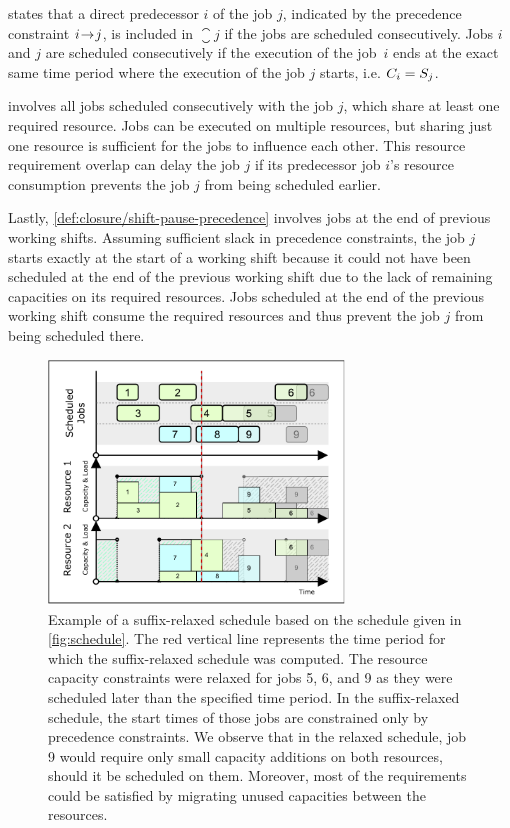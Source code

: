  states that a direct predecessor $i$ of the job $j$,
indicated by the precedence constraint $i \hspace{-0.2em} \rightarrow \hspace{-0.2em} j$,
is included in $\closure{j}$ if the jobs are scheduled consecutively.
Jobs $i$ and $j$ are scheduled consecutively if the execution of the job~$i$ ends
at the exact same time period where the execution of the job $j$ starts,
i.e. $C_{i} = S_{j}$.

 involves all jobs scheduled consecutively with the job $j$,
which share at least one required resource.
Jobs can be executed on multiple resources,
but sharing just one resource is sufficient for the jobs to influence each other.
This resource requirement overlap can delay the job $j$ if its predecessor job $i$'s resource consumption
prevents the job $j$ from being scheduled earlier.

Lastly, \cref{def:closure/shift-pause-precedence} involves jobs at the end of previous working shifts.
Assuming sufficient slack in precedence constraints,
the job $j$ starts exactly at the start of a working shift because
it could not have been scheduled at the end of the previous working shift
due to the lack of remaining capacities on its required resources.
Jobs scheduled at the end of the previous working shift consume the required resources
and thus prevent the job $j$ from being scheduled there.

\begin{figure}[p]
    \centering
    \includegraphics[width=0.7\textwidth]{img/Schedule-Relaxed.pdf}
    \caption{
        Example of a suffix-relaxed schedule based on the schedule given in \cref{fig:schedule}.
        The red vertical line represents the time period for which the suffix-relaxed schedule was computed.
        The resource capacity constraints were relaxed for jobs 5, 6, and 9
        as they were scheduled later than the specified time period.
        In the suffix-relaxed schedule,
        the start times of those jobs are constrained only by precedence constraints.
        We observe that in the relaxed schedule,
        job 9 would require only small capacity additions on both resources,
        should it be scheduled on them.
        Moreover, most of the requirements could be satisfied
        by migrating unused capacities between the resources.
        }
    \label{fig:schedule-relaxed}
\end{figure}

